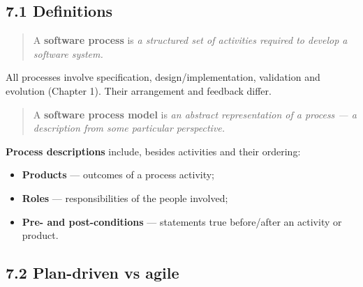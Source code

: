 \begin{studycolumns}
\vspace{0pt}



\subsection*{7.1 Definitions}

\begin{quote}\small\color{navy}
A \textbf{software process} is \emph{a structured set of activities required to develop a software system.}

\end{quote}
All processes involve specification, design/\allowbreak{}implementation, validation and evolution (Chapter 1). Their arrangement and feedback differ.

\begin{quote}\small\color{navy}
A \textbf{software process model} is \emph{an abstract representation of a process --- a description from some particular perspective.}

\end{quote}
\textbf{Process descriptions} include, besides activities and their ordering:

\begin{itemize}
\item \textbf{Products} --- outcomes of a process activity;
\item \textbf{Roles} --- responsibilities of the people involved;
\item \textbf{Pre- and post-conditions} --- statements true before/\allowbreak{}after an activity or product.
\end{itemize}
\end{studycolumns}

\subsection*{7.2 Plan-driven vs agile}


